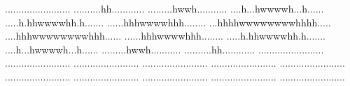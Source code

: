   {........................}
  {..........hh............}
  {.........hwwh...........}
  {....h...hwwwwh...h......}
  {.....h.hhwwwwhh.h.......}
  {......hhhwwwwhhh........}
  {...hhhhwwwwwwwwhhhh.....}
  {....hhhwwwwwwwwhhh......}
  {......hhhwwwwhhh........}
  {.....h.hhwwwwhh.h.......}
 {....h...hwwwwh...h......}
 {.........hwwh...........}
 {..........hh............}
 {........................}
 {........................}
 {........................}
 {........................}
 {........................}
 {........................}
 {........................}
 {........................}
 {........................}
 {........................}
 {........................}

\ExplSyntaxOff
